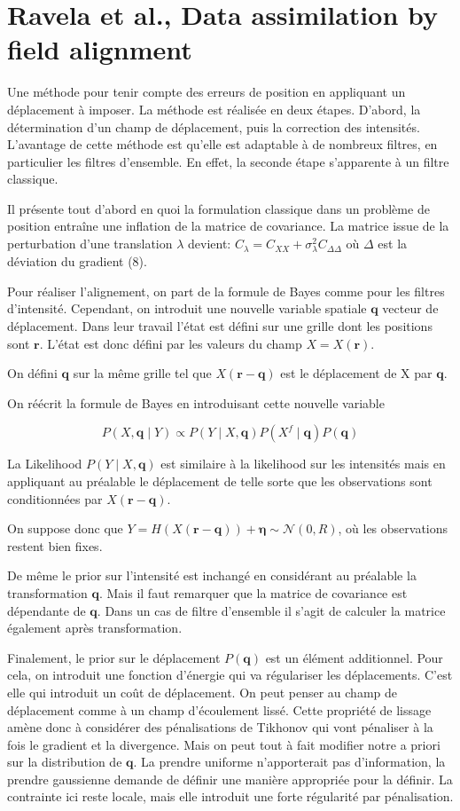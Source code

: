 \documentclass{article}
\newcommand{\bq}{\bm{q}}
\newcommand{\br}{\bm{r}}
\begin{document}
\section{Ravela et al., Data assimilation by field alignment}

Une méthode pour tenir compte des erreurs de position en appliquant un déplacement à imposer. La méthode est réalisée en deux étapes. D'abord, la détermination d'un champ de déplacement, puis la correction des intensités. L'avantage de cette méthode est qu'elle est adaptable à de nombreux filtres, en particulier les filtres d'ensemble. En effet, la seconde étape s'apparente à un filtre classique.

Il présente tout d'abord en quoi la formulation classique dans un problème de position entraîne une inflation de la matrice de covariance. La matrice issue de la perturbation d'une translation $\lambda$ devient: $C_{\lambda} = C_{XX} + \sigma^2_{\lambda} C_{\Delta\Delta}$ où $\Delta$ est la déviation du gradient (8).

Pour réaliser l'alignement, on part de la formule de Bayes comme pour les filtres d'intensité. Cependant, on introduit une nouvelle variable spatiale $\bq$ vecteur de déplacement. Dans leur travail l'état est défini sur une grille dont les positions sont $\br$. L'état est donc défini par les valeurs du champ $X = X(\br)$.

On défini $\bq$ sur la même grille tel que $X(\br  - \bq)$ est le déplacement de X par $\bq$.

On réécrit la formule de Bayes en introduisant cette nouvelle variable

$$
    P(X, \bq \mid Y) \propto P(Y \mid X, \bq) P(X^f \mid \bq) P(\bq)
$$

La Likelihood $P(Y \mid X, \bq)$ est similaire à la likelihood sur les intensités mais en appliquant au préalable le déplacement de telle sorte que les observations sont conditionnées par $X(\br - \bq)$.

On suppose donc que $Y = H(X(\br - \bq)) + \bm{\eta} \sim \mathcal{N}(0, R)$, où les observations restent bien fixes.

De même le prior sur l'intensité est inchangé en considérant au préalable la transformation $\bq$. Mais il faut remarquer que la matrice de covariance est dépendante de $\bq$. Dans un cas de filtre d'ensemble il s'agit de calculer la matrice également après transformation.

Finalement, le prior sur le déplacement $P(\mathbf{q})$ est un élément additionnel. Pour cela, on introduit une fonction d'énergie qui va régulariser les déplacements. C'est elle qui introduit un coût de déplacement. On peut penser au champ de déplacement comme à un champ d'écoulement lissé. Cette propriété de lissage amène donc à considérer des pénalisations de Tikhonov qui vont pénaliser à la fois le gradient et la divergence. Mais on peut tout à fait modifier notre a priori sur la distribution de $\mathbf{q}$. La prendre uniforme n'apporterait pas d'information, la prendre gaussienne demande de définir une manière appropriée pour la définir. La contrainte ici reste locale, mais elle introduit une forte régularité par pénalisation.
\end{document}
